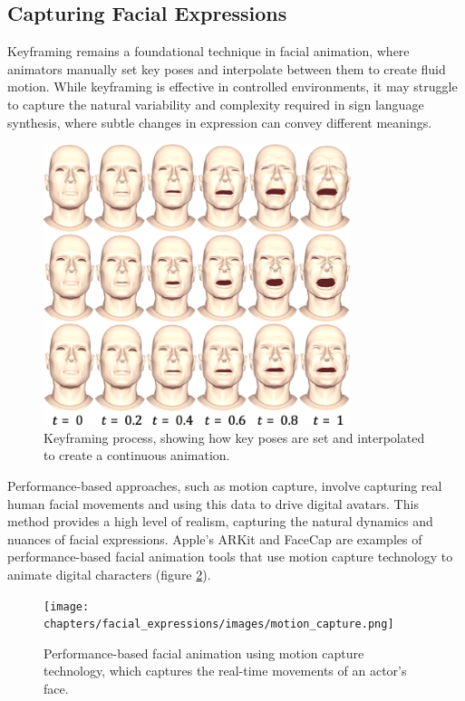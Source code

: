 \documentclass[../../main.tex]{subfiles}
\begin{document}
\subsection{Capturing Facial Expressions}
\label{ch:facial_expressions:related_work:face_rigging:capture}

Keyframing remains a foundational technique in facial animation, where animators manually set key poses and interpolate between them to create fluid motion. While keyframing is effective in controlled environments, it may struggle to capture the natural variability and complexity required in sign language synthesis, where subtle changes in expression can convey different meanings.

\begin{figure}
    \centering
    \includegraphics[width=0.8\textwidth]{chapters/facial_expressions/images/keyframing.png}
    \caption{Keyframing process, showing how key poses are set and interpolated to create a continuous animation.}
    \label{fig:keyframing}
\end{figure}

Performance-based approaches, such as motion capture, involve capturing real human facial movements and using this data to drive digital avatars. This method provides a high level of realism, capturing the natural dynamics and nuances of facial expressions. Apple's ARKit and FaceCap are examples of performance-based facial animation tools that use motion capture technology to animate digital characters (figure \ref{fig:motion_capture}).

\begin{figure}
    \centering
    \texttt{[image: chapters/facial\_expressions/images/motion\_capture.png]}
    \caption{Performance-based facial animation using motion capture technology, which captures the real-time movements of an actor’s face.}
    \label{fig:motion_capture}
\end{figure}
\end{document}
